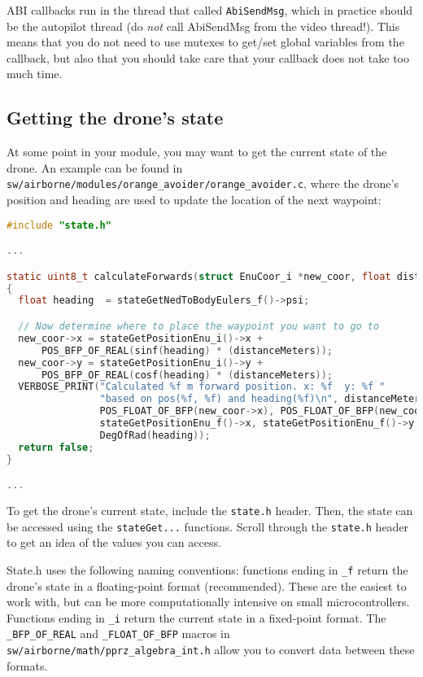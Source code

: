 \documentclass{article}
\begin{document}
ABI callbacks run in the thread that called \texttt{AbiSendMsg}, which in practice should be the autopilot thread (do \emph{not} call AbiSendMsg from the video thread!). This means that you do not need to use mutexes to get/set global variables from the callback, but also that you should take care that your callback does not take too much time.




\subsection{Getting the drone's state}
At some point in your module, you may want to get the current state of the drone.
An example can be found in \texttt{sw/airborne/modules/orange\_avoider/orange\_avoider.c}, where the drone's position and heading are used to update the location of the next waypoint:
\begin{lstlisting}[language=c]
#include "state.h"

...

static uint8_t calculateForwards(struct EnuCoor_i *new_coor, float distanceMeters)
{
  float heading  = stateGetNedToBodyEulers_f()->psi;

  // Now determine where to place the waypoint you want to go to
  new_coor->x = stateGetPositionEnu_i()->x + 
      POS_BFP_OF_REAL(sinf(heading) * (distanceMeters));
  new_coor->y = stateGetPositionEnu_i()->y +
      POS_BFP_OF_REAL(cosf(heading) * (distanceMeters));
  VERBOSE_PRINT("Calculated %f m forward position. x: %f  y: %f "
                "based on pos(%f, %f) and heading(%f)\n", distanceMeters,	
                POS_FLOAT_OF_BFP(new_coor->x), POS_FLOAT_OF_BFP(new_coor->y),
                stateGetPositionEnu_f()->x, stateGetPositionEnu_f()->y,
                DegOfRad(heading));
  return false;
}

...
\end{lstlisting}
To get the drone's current state, include the \texttt{state.h} header. Then, the state can be accessed using the \texttt{stateGet...} functions. Scroll through the \texttt{state.h} header to get an idea of the values you can access.

State.h uses the following naming conventions: functions ending in \texttt{\_f} return the drone's state in a floating-point format (recommended). These are the easiest to work with, but can be more computationally intensive on small microcontrollers. Functions ending in \texttt{\_i} return the current state in a fixed-point format. The \texttt{\_BFP\_OF\_REAL} and \texttt{\_FLOAT\_OF\_BFP} macros in \texttt{sw/airborne/math/pprz\_algebra\_int.h} allow you to convert data between these formats.
\end{document}
